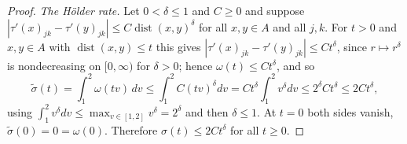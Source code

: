 \begin{proof}
\emph{The H\"older rate.}  Let $0<\delta\le1$ and $C\ge0$ and suppose
$|\tau'(x)_{jk}-\tau'(y)_{jk}|\le C\operatorname{dist}(x,y)^\delta$ for all
$x,y\in A$ and all $j,k$.  For $t>0$ and $x,y\in A$ with
$\operatorname{dist}(x,y)\le t$ this gives
$|\tau'(x)_{jk}-\tau'(y)_{jk}|\le Ct^\delta$, since $r\mapsto r^\delta$ is
nondecreasing on $[0,\infty)$ for $\delta>0$; hence $\omega(t)\le Ct^\delta$,
and so
\[
\tilde\sigma(t)=\int_1^2\omega(tv)\,dv\le\int_1^2C(tv)^\delta dv
=Ct^\delta\int_1^2v^\delta dv\le 2^{\delta}Ct^\delta\le2Ct^\delta,
\]
using $\int_1^2v^\delta dv\le\max_{v\in[1,2]}v^\delta=2^\delta$ and then
$\delta\le1$.  At $t=0$ both sides vanish, $\tilde\sigma(0)=0=\omega(0)$.
Therefore $\sigma(t)\le2Ct^\delta$ for all $t\ge0$.
\end{proof}
